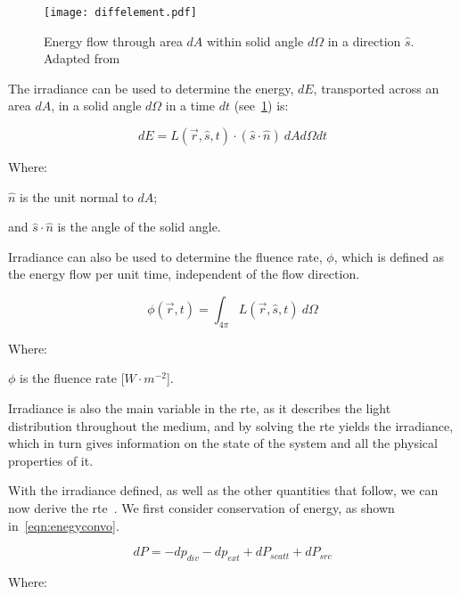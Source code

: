 \begin{figure}[!htb]
	\centering
	\texttt{[image: diffelement.pdf]}
	\caption{Energy flow through area $dA$ within solid angle $d\Omega$ in a direction $\hat{s}$. Adapted from~\cite{wang2012biomedical,chandrasekhar2013radiative}}
	\label{fig:energydiag1}
\end{figure}

The irradiance can be used to determine the energy, $dE$, transported across an area $dA$, in a solid angle $d\Omega$ in a time $dt$ (see~\cref{fig:energydiag1}) is:

\begin{equation}
	dE = L(\vec{r},\hat{s},t) \cdot (\hat{s} \cdot \hat{n})\ dAd\Omega dt
\end{equation}

\noindent Where:

\indent $\hat{n}$ is the unit normal to $dA$;

\indent and $\hat{s}\cdot\hat{n}$ is the angle of the solid angle.

\medskip

Irradiance can also be used to determine the fluence rate, $\phi$, which is defined as the energy flow per unit time, independent of the flow direction.

\begin{equation}
	\phi(\vec{r},t)=\int_{4\pi}L(\vec{r},\hat{s},t)\ d\Omega
\end{equation}

\noindent Where:

\indent $\phi$ is the fluence rate [$W \cdot m^{-2}$].

\medskip

Irradiance is also the main variable in the \gls{rte}, as it describes the light distribution throughout the medium, and by solving the \gls{rte} yields the irradiance, which in turn gives information on the state of the system and all the physical properties of it.

With the irradiance defined, as well as the other quantities that follow, we can now derive the \gls{rte}~\cite{chandrasekhar2013radiative,wang2012biomedical}. We first consider conservation of energy, as shown in~\cref{eqn:enegyconvo}.

\begin{equation}
	dP = -dp_{div} - dp_{ext} + dP_{scatt} + dP_{src}
	\label{eqn:enegyconvo}
\end{equation}

\noindent Where:

